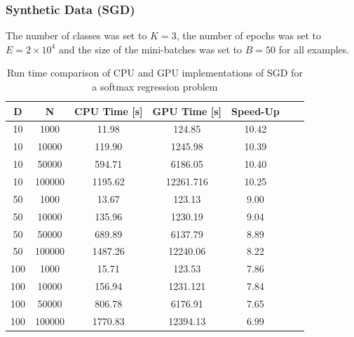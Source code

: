 \documentclass[10pt,a4paper]{beamer}
\begin{document}
\begin{frame}\frametitle{Synthetic Data (SGD)}
The number of classes was set to $K=3$, the number of epochs was set to $E=2 \times 10^4$ and the size of the mini-batches was set to $B=50$ for all examples.
\begin{table}[h]
	\centering
	\begin{tabular}{|c|c|c|c|c|c|c|}
		\hline 
		D & N & CPU Time [s] & GPU Time [s]  & Speed-Up\\ 
		\hline 
		10 &	1000&	11.98&	124.85& 10.42\\
		10&	10000&	119.90&	1245.98& 10.39\\
		10&	50000&	594.71&	6186.05& 10.40\\
		10&	100000&	1195.62&	12261.716& 10.25\\
		\hline
		50&	1000&	13.67&	123.13& 9.00\\
		50&	10000&	135.96&	1230.19& 9.04\\
		50&	50000&	689.89&	6137.79& 8.89\\
		50&	100000&	1487.26&	12240.06& 8.22\\
		\hline
		100&	1000&	15.71&	123.53& 7.86\\
		100	&10000&	156.94&	1231.121& 7.84\\
		100&	50000&	806.78&	6176.91& 7.65\\
		100&	100000&	1770.83&	12394.13& 6.99\\
		\hline 
	\end{tabular}
	\caption{Run time comparison of CPU and GPU implementations of SGD for a softmax regression problem}
	\label{tab:sgd} 
\end{table}
\end{frame}
\end{document}
